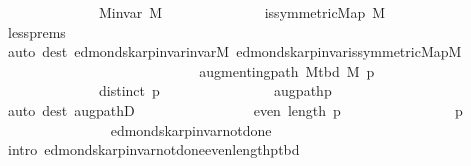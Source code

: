 \begin{isabellebody}
\ \ \ \ \ \ \ \ \ \ \ \ \ \ {\isachardoublequoteopen}M{\isachardot}{\kern0pt}invar\ M{\isachardoublequoteclose}\isanewline
\ \ \ \ \ \ \ \ \ \ \ \ \ \ {\isachardoublequoteopen}is{\isacharunderscore}{\kern0pt}symmetric{\isacharunderscore}{\kern0pt}Map\ M{\isachardoublequoteclose}\isanewline
\ \ \ \ \ \ \ \ \ \ \ \ \ \ \isamarkupfalse%
\ less{\isachardot}{\kern0pt}prems\isanewline
\ \ \ \ \ \ \ \ \ \ \ \ \ \ \isamarkupfalse%
\ {\isacharparenleft}{\kern0pt}auto\ dest{\isacharcolon}{\kern0pt}\ edmonds{\isacharunderscore}{\kern0pt}karp{\isacharunderscore}{\kern0pt}invar{\isachardot}{\kern0pt}invar{\isacharunderscore}{\kern0pt}M\ edmonds{\isacharunderscore}{\kern0pt}karp{\isacharunderscore}{\kern0pt}invar{\isachardot}{\kern0pt}is{\isacharunderscore}{\kern0pt}symmetric{\isacharunderscore}{\kern0pt}Map{\isacharunderscore}{\kern0pt}M{\isacharparenright}{\kern0pt}\isanewline
\ \ \ \ \ \ \ \ \ \ \ \ \isamarkupfalse%
\ \isamarkupfalse%
\isanewline
\ \ \ \ \ \ \ \ \ \ \ \ \ \ {\isachardoublequoteopen}augmenting{\isacharunderscore}{\kern0pt}path\ {\isacharparenleft}{\kern0pt}M{\isacharunderscore}{\kern0pt}tbd\ M{\isacharparenright}{\kern0pt}\ {\isacharquery}{\kern0pt}p{\isachardoublequoteclose}\isanewline
\ \ \ \ \ \ \ \ \ \ \ \ \ \ {\isachardoublequoteopen}distinct\ {\isacharquery}{\kern0pt}p{\isachardoublequoteclose}\isanewline
\ \ \ \ \ \ \ \ \ \ \ \ \ \ \isamarkupfalse%
\ augpath{\isacharunderscore}{\kern0pt}p\isanewline
\ \ \ \ \ \ \ \ \ \ \ \ \ \ \isamarkupfalse%
\ {\isacharparenleft}{\kern0pt}auto\ dest{\isacharcolon}{\kern0pt}\ augpathD{\isacharparenleft}{\kern0pt}{}{\isacharcomma}{\kern0pt}\ {}{\isacharparenright}{\kern0pt}{\isacharparenright}{\kern0pt}\isanewline
\ \ \ \ \ \ \ \ \ \ \ \ \isamarkupfalse%
\ \isamarkupfalse%
\ {\isachardoublequoteopen}even\ {\isacharparenleft}{\kern0pt}length\ {\isacharquery}{\kern0pt}p{\isacharparenright}{\kern0pt}{\isachardoublequoteclose}\isanewline
\ \ \ \ \ \ \ \ \ \ \ \ \ \ \isamarkupfalse%
\ p\isanewline
\ \ \ \ \ \ \ \ \ \ \ \ \ \ \isamarkupfalse%
\ edmonds{\isacharunderscore}{\kern0pt}karp{\isacharunderscore}{\kern0pt}invar{\isacharunderscore}{\kern0pt}not{\isacharunderscore}{\kern0pt}done{\isacharunderscore}{\kern0pt}{}\isanewline
\ \ \ \ \ \ \ \ \ \ \ \ \ \ \isamarkupfalse%
\ {\isacharparenleft}{\kern0pt}intro\ edmonds{\isacharunderscore}{\kern0pt}karp{\isacharunderscore}{\kern0pt}invar{\isacharunderscore}{\kern0pt}not{\isacharunderscore}{\kern0pt}done{\isacharunderscore}{\kern0pt}{}{\isachardot}{\kern0pt}even{\isacharunderscore}{\kern0pt}length{\isacharunderscore}{\kern0pt}p{\isacharunderscore}{\kern0pt}tbd{\isacharparenright}{\kern0pt}\isanewline

\end{isabellebody}
